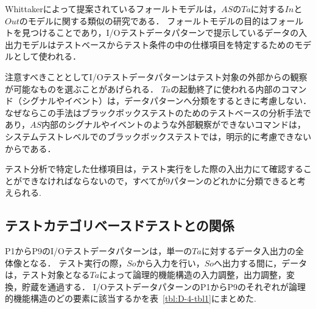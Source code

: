 Whittakerによって提案されているフォールトモデル\cite{whittaker2003break}は，$AS$の$Ta$に対する$In$と$Out$のモデルに関する類似の研究である．
フォールトモデルの目的はフォールトを見つけることであり，I/Oテストデータパターンで提示しているデータの入出力モデルはテストベースからテスト条件の中の仕様項目を特定するためのモデルとして使われる．


注意すべきこととしてI/Oテストデータパターンはテスト対象の外部からの観察が可能なものを選ぶことがあげられる．
$Ta$の起動終了に使われる内部のコマンド（シグナルやイベント）は，データパターンへ分類をするときに考慮しない．
なぜならこの手法はブラックボックステストのためのテストベースの分析手法であり，$AS$内部のシグナルやイベントのような外部観察ができないコマンドは，システムテストレベルでのブラックボックステストでは，明示的に考慮できないからである．

テスト分析で特定した仕様項目は，テスト実行をした際の入出力にて確認することができなければならないので，すべてが9パターンのどれかに分類できると考えられる.

\subsection{テストカテゴリベースドテストとの関係}

P1からP9のI/Oテストデータパターンは，単一の$Ta$に対するデータ入出力の全体像となる．
テスト実行の際，$So$から入力を行い，$So$へ出力する間に，データは，テスト対象となる$Ta$によって論理的機能構造の入力調整，出力調整，変換，貯蔵を通過する．
I/OテストデータパターンのP1からP9のそれぞれが論理的機能構造のどの要素に該当するかを表~\ref{tbl:D-4-tbl1}にまとめた.

